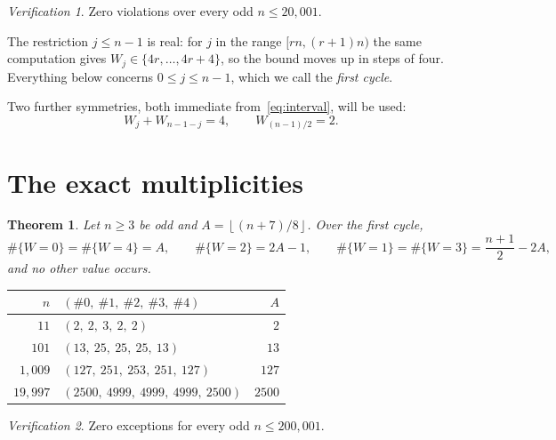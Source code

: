 \documentclass[11pt,reqno]{amsart}
\theoremstyle{plain}
\newtheorem{theorem}{Theorem}
\theoremstyle{remark}
\newtheorem*{verification}{Verification}
\numberwithin{equation}{section}
\newcommand{\fl}[1]{\left\lfloor #1 \right\rfloor}
\begin{document}
\begin{verification}
Zero violations over every odd $n \le 20{,}001$.
\end{verification}

The restriction $j \le n-1$ is real: for $j$ in the range $[rn,(r+1)n)$ the same
computation gives $W_j \in \{4r,\dots,4r+4\}$, so the bound moves up in steps of
four. Everything below concerns $0 \le j \le n-1$, which we call the
\emph{first cycle}.

Two further symmetries, both immediate from~\eqref{eq:interval}, will be used:
\begin{equation}\label{eq:sym}
  W_j + W_{n-1-j} = 4, \qquad W_{(n-1)/2} = 2 .
\end{equation}

\section{The exact multiplicities}\label{sec:mult}

\begin{theorem}\label{thm:mult}
Let $n \ge 3$ be odd and $A = \fl{(n+7)/8}$. Over the first cycle,
\[
  \#\{W{=}0\} = \#\{W{=}4\} = A, \qquad \#\{W{=}2\} = 2A-1, \qquad
  \#\{W{=}1\} = \#\{W{=}3\} = \frac{n+1}{2}-2A,
\]
and no other value occurs.
\end{theorem}

\begin{table}[h]
\centering
\begin{tabular}{r l r}
\toprule
$n$ & $(\#0,\ \#1,\ \#2,\ \#3,\ \#4)$ & $A$ \\
\midrule
$11$     & $(2,\ 2,\ 3,\ 2,\ 2)$                       & $2$ \\
$101$    & $(13,\ 25,\ 25,\ 25,\ 13)$                  & $13$ \\
$1{,}009$  & $(127,\ 251,\ 253,\ 251,\ 127)$           & $127$ \\
$19{,}997$ & $(2500,\ 4999,\ 4999,\ 4999,\ 2500)$      & $2500$ \\
\bottomrule
\end{tabular}
\end{table}

\begin{verification}
Zero exceptions for every odd $n \le 200{,}001$.
\end{verification}
\end{document}
